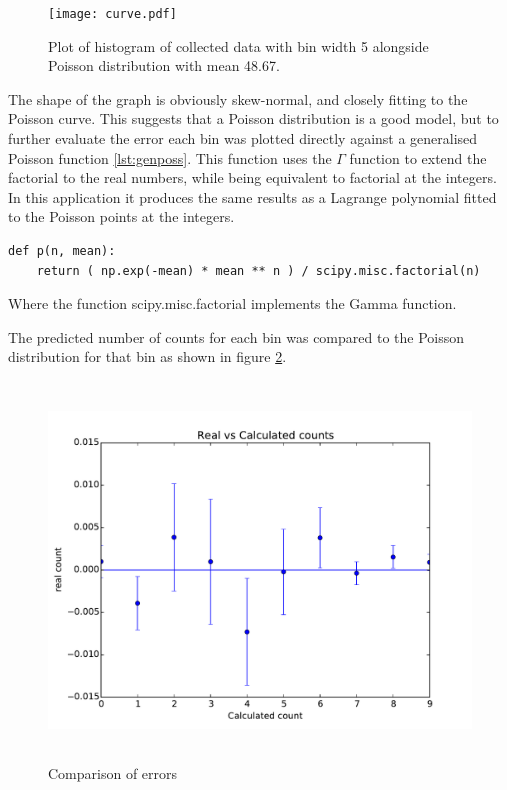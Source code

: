 \documentclass[10pt]{iopart}
\begin{document}
 \begin{figure}[htbp]
\begin{center}
\texttt{[image: curve.pdf]}
\caption{Plot of histogram of collected data with bin width 5 alongside Poisson distribution with mean 48.67.}
\label{curve}
\end{center}
\end{figure}

The shape of the graph is obviously skew-normal, and closely fitting to the Poisson curve. This suggests that a Poisson distribution is a good model, but to further evaluate the error each bin was plotted directly against a generalised Poisson function \ref{lst:genposs}. This function uses the $\Gamma$ function to extend the factorial to the real numbers, while being equivalent to factorial at the integers. In this application it produces the same results as a Lagrange polynomial fitted to the Poisson points at the integers.

\begin{lstlisting}[caption=Generalised Poisson in Python, label={lst:genposs}]
def p(n, mean):
	return ( np.exp(-mean) * mean ** n ) / scipy.misc.factorial(n)
\end{lstlisting}

Where the function scipy.misc.factorial implements the Gamma function.

The predicted number of counts for each bin was compared to the Poisson distribution for that bin as shown in figure \ref{errorcomp}.

 \begin{figure}[htbp]
\begin{center}
\includegraphics[height=10cm]{errorcomp.pdf}
\caption{Comparison of errors}
\label{errorcomp}
\end{center}
\end{figure}
\end{document}
